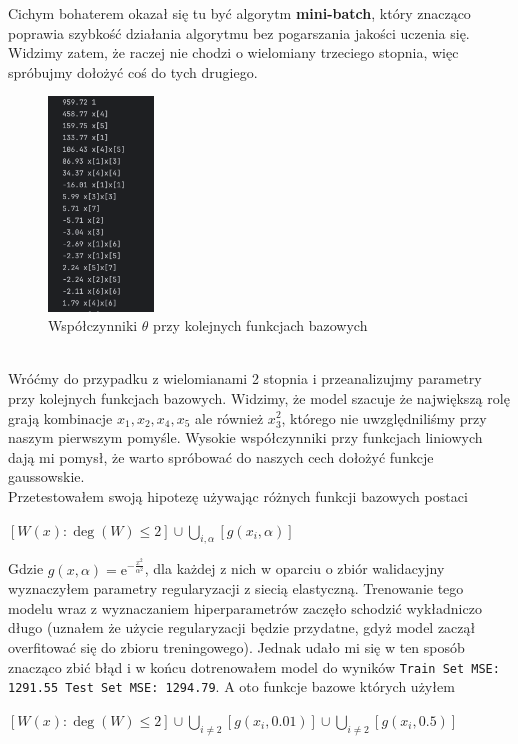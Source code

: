 \documentclass[polish,12pt,a4paper]{extarticle}
\renewcommand\leq{\leqslant}
\begin{document}
Cichym bohaterem okazał się tu być algorytm \textbf{mini-batch}, który znacząco poprawia szybkość działania algorytmu bez pogarszania jakości uczenia się. Widzimy zatem, że raczej nie chodzi o wielomiany trzeciego stopnia, więc spróbujmy dołożyć coś do tych drugiego.

\begin{figure}[h!]
    \centering

    \includegraphics[width=0.25\textwidth]{data/sorted.png}
    \caption{Współczynniki $\theta$ przy kolejnych funkcjach bazowych}
\end{figure} \\

Wróćmy do przypadku z wielomianami 2 stopnia i przeanalizujmy parametry przy kolejnych funkcjach bazowych. Widzimy, że model szacuje że największą rolę grają kombinacje $x_1, x_2, x_4, x_5$ ale również $x_3^2$, którego nie uwzględniliśmy przy naszym pierwszym pomyśle. Wysokie współczynniki przy funkcjach liniowych dają mi pomysł, że warto spróbować do naszych cech dołożyć funkcje gaussowskie. \bigskip \\
Przetestowałem swoją hipotezę używając różnych funkcji bazowych postaci
\begin{center}
$[W(x) : \deg(W) \leq 2] \cup \bigcup_{i, \alpha}[g(x_i, \alpha)]$
\end{center}
Gdzie $g(x, \alpha) = \mathrm{e}^{-\frac{x^2}{\alpha^2}}$, dla każdej z nich w oparciu o zbiór walidacyjny wyznaczyłem parametry regularyzacji z siecią elastyczną. Trenowanie tego modelu wraz z wyznaczaniem hiperparametrów zaczęło schodzić wykładniczo długo (uznałem że użycie regularyzacji będzie przydatne, gdyż model zaczął overfitować się do zbioru treningowego). Jednak udało mi się w ten sposób znacząco zbić błąd i w końcu dotrenowałem model do wyników \texttt{Train Set MSE: 1291.55 Test Set MSE: 1294.79}. A oto funkcje bazowe których użyłem
\begin{center}
    $[W(x) : \deg(W) \leq 2] \cup \bigcup_{i\neq 2}[g(x_i, 0.01)]\cup \bigcup_{i\neq 2}[g(x_i, 0.5)]$
\end{center}
\end{document}
